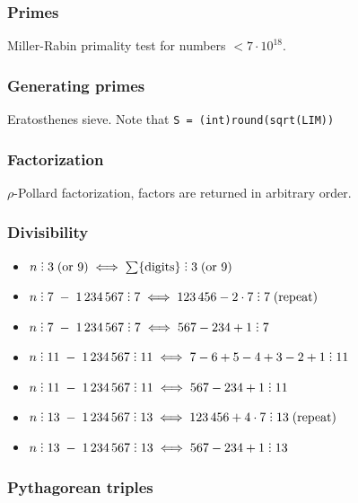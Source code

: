\subsubsection{Primes}

Miller-Rabin primality test for numbers $< 7 \cdot 10^{18}$. 

\subsubsection{Generating primes}

Eratosthenes sieve.
Note that \verb|S = (int)round(sqrt(LIM))|

\subsubsection{Factorization}

$\rho$-Pollard factorization, factors are returned in arbitrary order.

\subsubsection{Divisibility}

\vspace{1em}
\begin{itemize}
  \item $n \divby 3 \;(\text{or } 9) \iff \sum\{\text{digits}\} \divby 3 \;(\text{or } 9)$
  \item $n \divby 7 \;-\; 1\,234\,567 \divby 7 \iff 123\,456 - 2 \cdot 7 \divby 7 \;\text{(repeat)}$
  \item $n \divby 7 \;-\; 1\,234\,567 \divby 7 \iff 567 - 234 + 1 \divby 7$
  \item $n \divby 11 \;-\; 1\,234\,567 \divby 11 \iff 7 - 6 + 5 - 4 + 3 - 2 + 1 \divby 11$
  \item $n \divby 11 \;-\; 1\,234\,567 \divby 11 \iff 567 - 234 + 1 \divby 11$
  \item $n \divby 13 \;-\; 1\,234\,567 \divby 13 \iff 123\,456 + 4 \cdot 7 \divby 13 \;\text{(repeat)}$
  \item $n \divby 13 \;-\; 1\,234\,567 \divby 13 \iff 567 - 234 + 1 \divby 13$
\end{itemize}

\subsubsection{Pythagorean triples}

